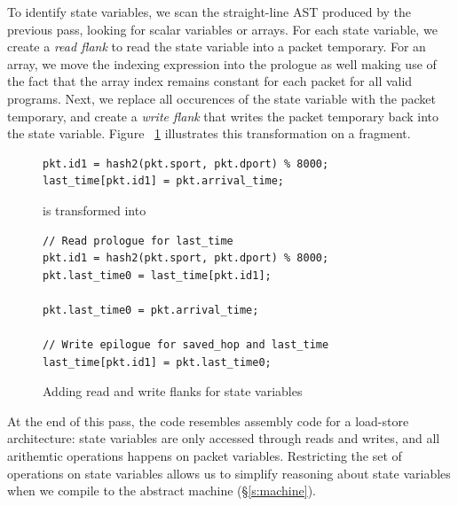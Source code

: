 
To identify state variables, we scan the straight-line AST produced by the
previous pass, looking for scalar variables or arrays. For each state variable,
we create a \textit{read flank} to read the state variable into a packet
temporary. For an array, we move the indexing expression into the prologue as
well making use of the fact that the array index remains constant for each
packet for all valid \pktlanguage programs. Next, we replace all occurences of
the state variable with the packet temporary, and create a \textit{write flank}
that writes the packet temporary back into the state variable.  Figure
~\ref{fig:stateful_flanks} illustrates this transformation on a fragment.

\begin{figure}
\begin{tiny}
\begin{lstlisting}
pkt.id1 = hash2(pkt.sport, pkt.dport) % 8000;
last_time[pkt.id1] = pkt.arrival_time;
\end{lstlisting}
\end{tiny}
\begin{center}
is transformed into
\end{center}
\begin{tiny}
\begin{lstlisting}
// Read prologue for last_time
pkt.id1 = hash2(pkt.sport, pkt.dport) % 8000;
pkt.last_time0 = last_time[pkt.id1];

pkt.last_time0 = pkt.arrival_time;

// Write epilogue for saved_hop and last_time
last_time[pkt.id1] = pkt.last_time0;
\end{lstlisting}
\end{tiny}
\caption{Adding read and write flanks for state variables}
\label{fig:stateful_flanks}
\end{figure}

At the end of this pass, the code resembles assembly code for a load-store
architecture: state variables are only accessed through reads and writes, and
all arithemtic operations happens on packet variables. Restricting the set of
operations on state variables allows us to simplify reasoning about state
variables when we compile \pktlanguage to the abstract machine
(\S\ref{s:machine}).

